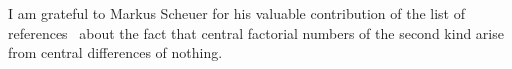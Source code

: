 I am grateful to Markus Scheuer for his valuable contribution of the list of
references~\cite{RiordanCentralFactorialMSE2020}
about the fact that central factorial numbers of the second kind
arise from central differences of nothing.
